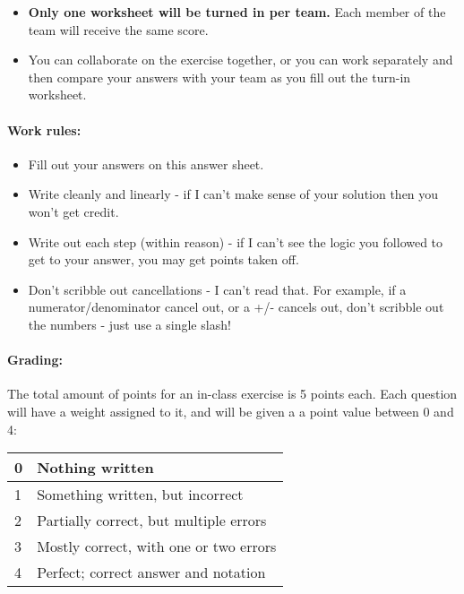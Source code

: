 \documentclass[a4paper,12pt]{book}
\begin{document}
    \begin{itemize}
        \item \textbf{Only one worksheet will be turned in per team.}
            Each member of the team will receive the same score.
        \item You can collaborate on the exercise together, or you can
            work separately and then compare your answers with your team
            as you fill out the turn-in worksheet.
    \end{itemize}

    \paragraph{Work rules:}

    \begin{itemize}
        \item Fill out your answers on this answer sheet.
        \item Write cleanly and linearly - if I can't make sense of
            your solution then you won't get credit.
        \item Write out each step (within reason) - if I can't see the
            logic you followed to get to your answer, you may get points taken off.
        \item Don't scribble out cancellations - I can't read that.
            For example, if a numerator/denominator cancel out, or a +/-
            cancels out, don't scribble out the numbers - just use a single slash!
    \end{itemize}

    \paragraph{Grading:}
        The total amount of points for an in-class exercise is 5 points each.
        Each question will have a weight assigned to it, and will be given
        a a point value between 0 and 4:

    \begin{center}
        \begin{tabular}{ | l | l | }
            \hline
            0 & Nothing written \\ \hline
            1 & Something written, but incorrect \\ \hline
            2 & Partially correct, but multiple errors \\ \hline
            3 & Mostly correct, with one or two errors \\ \hline
            4 & Perfect; correct answer and notation \\ \hline
            
        \end{tabular}
    \end{center}
    
\end{document}
